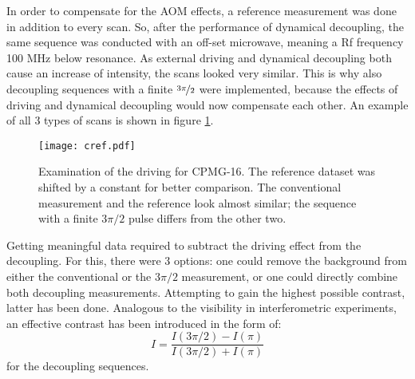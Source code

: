 \documentclass[12pt,a4paper]{article}
\begin{document}
In order to compensate for the AOM effects, a reference measurement was done in addition to every scan. So, after the performance of dynamical decoupling, the same sequence was conducted with an off-set microwave, meaning a Rf frequency 100 MHz below resonance. As external driving and dynamical decoupling both cause an increase of intensity, the scans looked very similar. This is why also decoupling sequences with a finite $\nicefrac{3\pi}{2}$ were implemented, because the effects of driving and dynamical decoupling would now compensate each other. An example of all 3 types of scans is shown in figure \ref{cr}.\\
\begin{figure}[H]
\texttt{[image: cref.pdf]} 
\caption{Examination of the driving for CPMG-16. The reference dataset was shifted by a constant for better comparison. The conventional measurement and the reference look almost similar; the sequence with a finite $3\pi/2$ pulse differs from the other two.}
\label{cr}
\end{figure}
Getting meaningful data required to subtract the driving effect from the decoupling. For this, there were 3 options: one could remove the background from either the conventional or the $3\pi/2$ measurement, or one could directly combine both decoupling measurements. Attempting to gain the highest possible contrast, latter has been done. Analogous to the visibility in interferometric experiments, an effective contrast has been introduced in the form of:
\begin{equation}
I=\frac{I(3\pi/2)-I(\pi)}{I(3\pi/2)+I(\pi)}
\end{equation}
for the decoupling sequences. 
\end{document}
